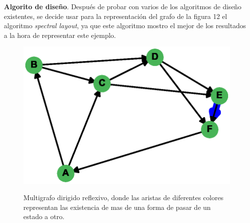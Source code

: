\documentclass{article}
\begin{document}
\textbf{Algorito de diseño}.\linebreak
Después de probar con varios de los algoritmos de diseño existentes, se decide usar para la representación del grafo de la figura 12 el algoritmo \textit{spectral layout}, ya que este algoritmo mostro el mejor de los resultados a la hora de representar este ejemplo.
\begin{center}

\end{center}
\begin{figure}[h]
\begin{center}
\includegraphics[scale=0.7]{Graf12_spectral_layout.eps}\\
\caption{Multigrafo dirigido reflexivo, donde las aristas de diferentes colores representan las existencia de mas de una forma de pasar de un estado a otro.}
\end{center}
\end{figure}
\newpage



\end{document}
